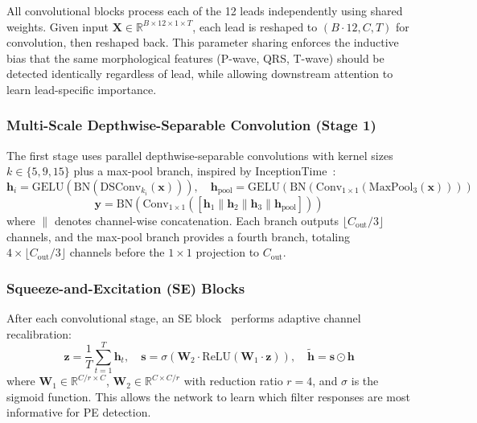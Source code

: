 \documentclass[11pt,a4paper]{article}
\begin{document}
All convolutional blocks process each of the 12 leads independently using shared weights. Given input $\mathbf{X} \in \mathbb{R}^{B \times 12 \times 1 \times T}$, each lead is reshaped to $(B {\cdot} 12, C, T)$ for convolution, then reshaped back. This parameter sharing enforces the inductive bias that the same morphological features (P-wave, QRS, T-wave) should be detected identically regardless of lead, while allowing downstream attention to learn lead-specific importance.

\subsubsection{Multi-Scale Depthwise-Separable Convolution (Stage 1)}

The first stage uses parallel depthwise-separable convolutions with kernel sizes $k \in \{5, 9, 15\}$ plus a max-pool branch, inspired by InceptionTime~\cite{ismail2020}:
\begin{equation}
\mathbf{h}_i = \text{GELU}\!\left(\text{BN}\!\left(\text{DSConv}_{k_i}(\mathbf{x})\right)\right), \quad
\mathbf{h}_{\text{pool}} = \text{GELU}\!\left(\text{BN}\!\left(\text{Conv}_{1\times1}\!\left(\text{MaxPool}_3(\mathbf{x})\right)\right)\right)
\end{equation}
\begin{equation}
\mathbf{y} = \text{BN}\!\left(\text{Conv}_{1\times1}\!\left([\mathbf{h}_1 \| \mathbf{h}_2 \| \mathbf{h}_3 \| \mathbf{h}_{\text{pool}}]\right)\right)
\end{equation}
where $\|$ denotes channel-wise concatenation. Each branch outputs $\lfloor C_{\text{out}}/3 \rfloor$ channels, and the max-pool branch provides a fourth branch, totaling $4 \times \lfloor C_{\text{out}}/3 \rfloor$ channels before the $1\times1$ projection to $C_{\text{out}}$.

\subsubsection{Squeeze-and-Excitation (SE) Blocks}

After each convolutional stage, an SE block~\cite{hu2018} performs adaptive channel recalibration:
\begin{equation}
\mathbf{z} = \frac{1}{T} \sum_{t=1}^{T} \mathbf{h}_t, \quad
\mathbf{s} = \sigma\!\left(\mathbf{W}_2 \cdot \text{ReLU}\!\left(\mathbf{W}_1 \cdot \mathbf{z}\right)\right), \quad
\tilde{\mathbf{h}} = \mathbf{s} \odot \mathbf{h}
\end{equation}
where $\mathbf{W}_1 \in \mathbb{R}^{C/r \times C}$, $\mathbf{W}_2 \in \mathbb{R}^{C \times C/r}$ with reduction ratio $r{=}4$, and $\sigma$ is the sigmoid function. This allows the network to learn which filter responses are most informative for PE detection.
\end{document}
